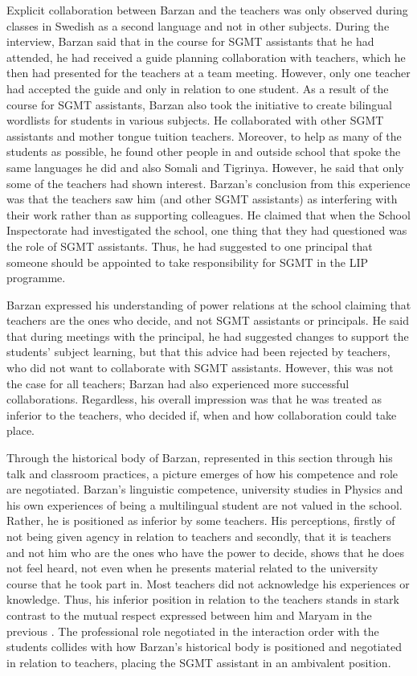 \documentclass[output=paper]{langscibook}
\begin{document}
Explicit collaboration between Barzan and the teachers was only observed during classes in Swedish as a second language and not in other subjects. During the interview, Barzan said that in the course for SGMT assistants that he had attended, he had received a guide planning collaboration with teachers, which he then had presented for the teachers at a team meeting. However, only one teacher had accepted the guide and only in relation to one student. As a result of the course for SGMT assistants, Barzan also took the initiative to create bilingual wordlists for students in various subjects. He collaborated with other SGMT assistants and mother tongue tuition teachers. Moreover, to help as many of the students as possible, he found other people in and outside school that spoke the same languages he did and also Somali and Tigrinya. However, he said that only some of the teachers had shown interest. Barzan’s conclusion from this experience was that the teachers saw him (and other SGMT assistants) as interfering with their work rather than as supporting colleagues. He claimed that when the School Inspectorate had investigated the school, one thing that they had questioned was the role of SGMT assistants. Thus, he had suggested to one principal that someone should be appointed to take responsibility for SGMT in the LIP programme. 

Barzan expressed his understanding of power relations at the school claiming that teachers are the ones who decide, and not SGMT assistants or principals. He said that during meetings with the principal, he had suggested changes to support the students’ subject learning, but that this advice had been rejected by teachers, who did not want to collaborate with SGMT assistants. However, this was not the case for all teachers; Barzan had also experienced more successful collaborations. Regardless, his overall impression was that he was treated as inferior to the teachers, who decided if, when and how collaboration could take place.  

Through the historical body of Barzan, represented in this section through his talk and classroom practices, a picture emerges of how his competence and role are negotiated. Barzan’s linguistic competence, university studies in Physics and his own experiences of being a multilingual student are not valued in the school. Rather, he is positioned as inferior by some teachers. His perceptions, firstly of not being given agency in relation to teachers and secondly, that it is teachers and not him who are the ones who have the power to decide, shows that he does not feel heard, not even when he presents material related to the university course that he took part in. Most teachers did not acknowledge his experiences or knowledge. Thus, his inferior position in relation to the teachers stands in stark contrast to the mutual respect expressed between him and Maryam in the previous . The professional role negotiated in the interaction order with the students collides with how Barzan’s historical body is positioned and negotiated in relation to teachers, placing the SGMT assistant in an ambivalent position. 
\end{document}
